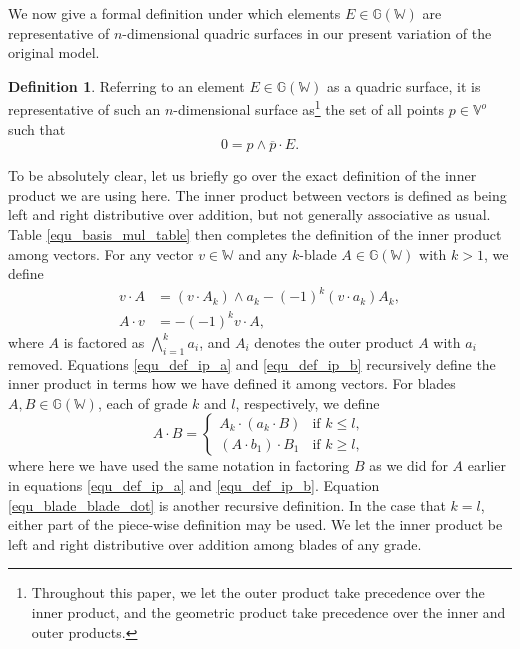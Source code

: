 \documentclass{birkjour}
\theoremstyle{definition}
\newtheorem{defn}[thm]{Definition}
\theoremstyle{remark}
\numberwithin{equation}{section}
\newcommand{\G}{\mathbb{G}}
\newcommand{\V}{\mathbb{V}}
\newcommand{\W}{\mathbb{W}}
\begin{document}
We now give a formal definition under which elements $E\in\G(\W)$
are representative of $n$-dimensional quadric surfaces in our present variation
of the original model.
\begin{defn}\label{def_quadric}
Referring to an element $E\in\G(\W)$ as a quadric surface, it is representative of such an $n$-dimensional surface as\footnote{Throughout this paper, we let the outer product take precedence
over the inner product, and the geometric product take precedence over the inner and
outer products.} the set of all points $p\in\V^o$ such that
\begin{equation}\label{equ_quadric_equation}
0 = p\wedge\overline{p}\cdot E.
\end{equation}
\end{defn}
To be absolutely clear, let us briefly go over the exact definition of the inner product
we are using here.  The inner product between vectors is defined as being left
and right distributive over addition, but not generally associative as usual.
Table \eqref{equ_basis_mul_table} then completes the definition of the inner product among vectors.
For any vector $v\in\W$ and any $k$-blade $A\in\G(\W)$ with $k>1$, we define
\begin{align}
v\cdot A &= (v\cdot A_k)\wedge a_k-(-1)^k(v\cdot a_k)A_k,\label{equ_def_ip_a} \\
A\cdot v &=-(-1)^kv\cdot A,\label{equ_def_ip_b}
\end{align}
where $A$ is factored as $\bigwedge_{i=1}^k a_i$, and $A_i$ denotes
the outer product $A$ with $a_i$ removed.  Equations \eqref{equ_def_ip_a} and \eqref{equ_def_ip_b}
recursively define the inner product in terms how we have defined it among vectors.
For blades $A,B\in\G(\W)$, each of grade $k$ and $l$, respectively, we define
\begin{equation}\label{equ_blade_blade_dot}
A\cdot B = \left\{
\begin{array}{ll}
A_k\cdot (a_k\cdot B) & \mbox{if $k\leq l$}, \\
(A\cdot b_1)\cdot B_1 & \mbox{if $k\geq l$},
\end{array}
\right.
\end{equation}
where here we have used the same notation in factoring $B$ as we
did for $A$ earlier in equations \eqref{equ_def_ip_a} and \eqref{equ_def_ip_b}.
Equation \eqref{equ_blade_blade_dot} is another recursive definition.  In the
case that $k=l$, either part of the piece-wise definition may be used.
We let the inner product be left and right distributive over addition among
blades of any grade.
\end{document}
